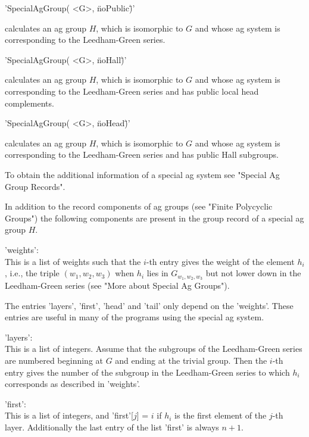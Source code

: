 \vspace{.5cm}
'SpecialAgGroup( <G>, \"noPublic\" )' 

calculates an ag group $H$, which is isomorphic to $G$ and whose ag
system is corresponding to the Leedham-Green series.

\vspace{.5cm}
'SpecialAgGroup( <G>, \"noHall\" )' 

calculates an ag group $H$, which is isomorphic to $G$ and whose ag
system is corresponding to the Leedham-Green series and has public local
head complements.

\vspace{.5cm}
'SpecialAgGroup( <G>, \"noHead\" )' 

calculates an ag group $H$, which is isomorphic to $G$ and whose ag
system is corresponding to the Leedham-Green series and has public Hall
subgroups.

To obtain the additional information of a special ag system see "Special
Ag Group Records".


In addition to the record components of ag groups (see "Finite Polycyclic
Groups") the following components are present in the group record of a
special ag group $H$.

'weights':  \\
    This is a list of weights such that the $i$-th entry gives the weight
    of  the element $h_i$, i.e., the triple  $(w_1,  w_2, w_3)$ when
    $h_i$  lies  in  $G_{w_1,  w_2,  w_3}$ but  not  lower  down  in  the
    Leedham-Green series (see "More about Special Ag Groups").

The entries 'layers', 'first', 'head' and 'tail' only depend on the
'weights'.  These entries are useful in many of the programs using the
special ag system.

'layers':  \\
    This  is  a list  of integers.  Assume that  the  subgroups of  the
    Leedham-Green series  are numbered beginning at $G$ and ending at the
    trivial group.  Then the $i$-th  entry gives the number of the
    subgroup in  the Leedham-Green  series to which $h_i$ corresponds  as
    described in 'weights'.

'first':  \\
    This is a list of integers, and 'first'[$j$] =  $i$ if $h_i$  is the
    first element of the $j$-th  layer.  Additionally the  last  entry of
    the list 'first' is always $n + 1$.

